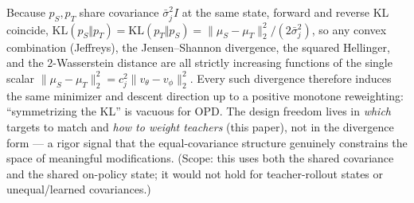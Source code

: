 \begin{remark}
\label{rem:symmetry}
Because $p_S,p_T$ share covariance $\bar\sigma_j^2 I$ at the same state, forward and
reverse KL coincide,
$\mathrm{KL}(p_S\Vert p_T)=\mathrm{KL}(p_T\Vert p_S)=\|\mu_S-\mu_T\|_2^2/(2\bar\sigma_j^2)$,
so any convex combination (Jeffreys), the Jensen--Shannon divergence, the squared
Hellinger, and the $2$-Wasserstein distance are all strictly increasing functions of the
single scalar $\|\mu_S-\mu_T\|_2^2=c_j^2\|v_\theta-v_\phi\|_2^2$. Every such divergence
therefore induces the same minimizer and descent direction up to a positive monotone
reweighting: ``symmetrizing the KL'' is vacuous for OPD. The design freedom lives in
\emph{which} targets to match and \emph{how to weight teachers} (this paper), not in the
divergence form --- a rigor signal that the equal-covariance structure genuinely
constrains the space of meaningful modifications. (Scope: this uses both the shared
covariance and the shared on-policy state; it would not hold for teacher-rollout states
or unequal/learned covariances.)
\end{remark}

